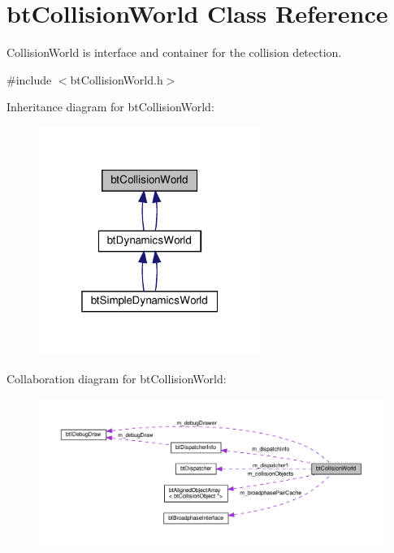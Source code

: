 \hypertarget{classbtCollisionWorld}{}\section{bt\+Collision\+World Class Reference}
\label{classbtCollisionWorld}


Collision\+World is interface and container for the collision detection.  




{\ttfamily \#include $<$bt\+Collision\+World.\+h$>$}



Inheritance diagram for bt\+Collision\+World\+:
\nopagebreak
\begin{figure}[H]
\begin{center}
\leavevmode
\includegraphics[width=205pt]{classbtCollisionWorld__inherit__graph}
\end{center}
\end{figure}


Collaboration diagram for bt\+Collision\+World\+:
\nopagebreak
\begin{figure}[H]
\begin{center}
\leavevmode
\includegraphics[width=350pt]{classbtCollisionWorld__coll__graph}
\end{center}
\end{figure}
